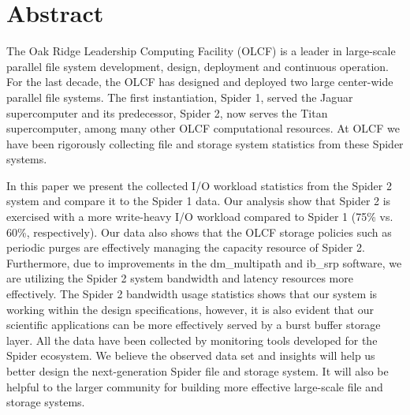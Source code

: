 \section*{Abstract}
\label{sec:abstract}

The Oak Ridge Leadership Computing Facility (OLCF) is a leader in large-scale
parallel file system development, design, deployment and continuous operation.
For the last decade, the OLCF has designed and deployed two large center-wide
parallel file systems. The first instantiation, Spider 1, served the Jaguar 
supercomputer and its predecessor, Spider 2, now serves the Titan supercomputer, 
among many other OLCF computational resources. At OLCF we have been rigorously 
collecting file and storage system statistics from these Spider systems.

In this paper we present the collected I/O workload statistics from the Spider
2 system and compare it to the Spider 1 data. Our analysis show that Spider 2
is exercised with a more write-heavy I/O workload compared to Spider 1 (75\%
vs. 60\%, respectively). Our data also shows that the OLCF storage policies
such as periodic purges are effectively managing the capacity resource of
Spider 2.  Furthermore, due to improvements in the dm\_multipath and ib\_srp
software, we are utilizing the Spider 2 system bandwidth and latency resources
more effectively.  The Spider 2 bandwidth usage statistics shows that our
system is working within the design specifications, however, it is also evident
that our scientific applications can be more effectively served by a burst
buffer storage layer.  All the data have been collected by monitoring tools
developed for the Spider ecosystem. We believe the observed data set and
insights will help us better design the next-generation Spider file and storage
system. It will also be helpful to the larger community for building more
effective large-scale file and storage systems.

 

